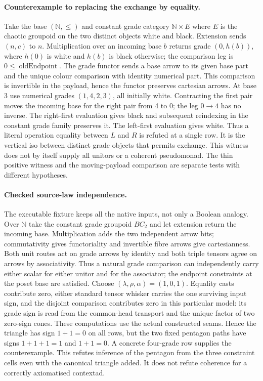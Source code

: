 \documentclass[11pt]{article}
\newcommand{\code}[1]{\texttt{\detokenize{#1}}}
\begin{document}
\paragraph{Counterexample to replacing the exchange by equality.}
Take the base $(\mathbb{N},\leq)$ and constant grade category $\mathbb{N}\times E$ where $E$ is the chaotic groupoid on the two distinct objects white and black. Extension sends $(n,c)$ to $n$. Multiplication over an incoming base $b$ returns grade $(0,h(b))$, where $h(0)$ is white and $h(b)$ is black otherwise; the comparison leg is $0\leq\operatorname{oldEndpoint}$. The grade functor sends a base arrow to its given base part and the unique colour comparison with identity numerical part. This comparison is invertible in the payload, hence the functor preserves cartesian arrows. At base 3 use numerical grades $(1,4,2,3)$, all initially white. Contracting the first pair moves the incoming base for the right pair from 4 to 0; the leg $0\to4$ has no inverse. The right-first evaluation gives black and subsequent reindexing in the constant grade family preserves it. The left-first evaluation gives white. Thus a literal operation equality between $L$ and $R$ is refuted at a single row. It is the vertical iso between distinct grade objects that permits exchange. This witness does not by itself supply all unitors or a coherent pseudomonad. The thin positive witness and the moving-payload comparison are separate tests with different hypotheses.
\paragraph{Checked source-law independence.}
The executable fixture \code{checks/CentralNoncoherent.lean} keeps all the native inputs, not only a Boolean analogy. Over $\mathbb N$ take the constant grade groupoid $BC_2$ and let extension return the incoming base. Multiplication adds the two independent arrow bits; commutativity gives functoriality and invertible fibre arrows give cartesianness. Both unit routes act on grade arrows by identity and both triple tensors agree on arrows by associativity. Thus a natural grade comparison can independently carry either scalar for either unitor and for the associator; the endpoint constraints at the poset base are satisfied. Choose $(\lambda,\rho,\alpha)=(1,0,1)$. Equality casts contribute zero, either standard tensor whisker carries the one surviving input sign, and the disjoint comparison contributes zero in this particular model: its grade sign is read from the common-head transport and the unique factor of two zero-sign cones. These computations use the actual constructed seams. Hence the triangle has sign $1+1=0$ on all rows, but the two fixed pentagon paths have signs $1+1+1=1$ and $1+1=0$. A concrete four-grade row supplies the counterexample. This refutes inference of the pentagon from the three constraint cells even with the canonical triangle added. It does not refute coherence for a correctly axiomatised contextad.
\end{document}
